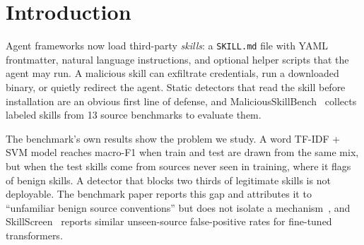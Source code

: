 \documentclass[conference]{IEEEtran}
\begin{document}
\section{Introduction}
Agent frameworks now load third-party \emph{skills}: a \texttt{SKILL.md} file with YAML frontmatter, natural
language instructions, and optional helper scripts that the agent may run. A malicious skill can exfiltrate
credentials, run a downloaded binary, or quietly redirect the agent. Static detectors that read the skill
before installation are an obvious first line of defense, and MaliciousSkillBench~\cite{msb2026} collects
\DataSkills{} labeled skills from 13 source benchmarks to evaluate them.

The benchmark's own results show the problem we study. A word TF-IDF + SVM model reaches macro-F1
\RandomSvmFone{} when train and test are drawn from the same mix, but \SourceSvmFone{} when the test skills
come from sources never seen in training, where it flags \SourceSvmFpr{} of benign skills. A detector that
blocks two thirds of legitimate skills is not deployable. The benchmark paper reports this gap and attributes
it to ``unfamiliar benign source conventions'' but does not isolate a mechanism~\cite{msb2026}, and
SkillScreen~\cite{skillscreen2026} reports similar unseen-source false-positive rates for fine-tuned
transformers.
\end{document}
